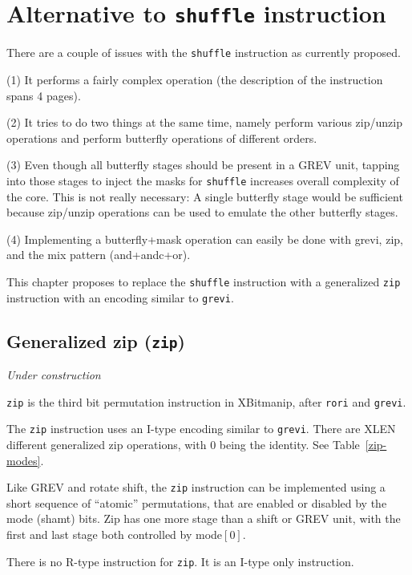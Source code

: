 \chapter{Alternative to \texttt{shuffle} instruction}

There are a couple of issues with the {\tt shuffle} instruction as currently proposed.

(1) It performs a fairly complex operation (the description of the instruction
spans 4 pages).

(2) It tries to do two things at the same time, namely perform various zip/unzip
operations and perform butterfly operations of different orders.

(3) Even though all butterfly stages should be present in a GREV unit, tapping into
those stages to inject the masks for {\tt shuffle} increases overall complexity of
the core. This is not really necessary: A single butterfly stage would be sufficient
because zip/unzip operations can be used to emulate the other butterfly stages.

(4) Implementing a butterfly+mask operation can easily be done with grevi, zip,
and the mix pattern (and+andc+or).

This chapter proposes to replace the {\tt shuffle} instruction with a generalized
{\tt zip} instruction with an encoding similar to {\tt grevi}.


\section{Generalized zip (\texttt{zip})}

{\it Under construction}

{\tt zip} is the third bit permutation instruction in XBitmanip, after {\tt rori}
and {\tt grevi}.

The {\tt zip} instruction uses an I-type encoding similar to {\tt grevi}. There
are XLEN different generalized zip operations, with 0 being the identity. See
Table~\ref{zip-modes}.

Like GREV and rotate shift, the {\tt zip} instruction can be implemented using a short
sequence of ``atomic'' permutations, that are enabled or disabled by the mode (shamt)
bits. Zip has one more stage than a shift or GREV unit, with the first and last stage
both controlled by mode$[0]$.

There is no R-type instruction for {\tt zip}. It is an I-type only instruction.

